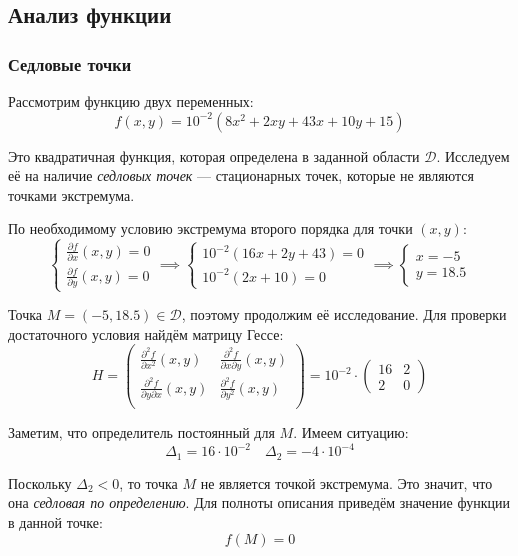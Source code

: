 \subsection{Анализ функции}

\subsubsection{Седловые точки}

Рассмотрим функцию двух переменных:
\[
  f(x,y)=10^{-2}(8x^2+2xy+43x+10y+15)
\]

Это квадратичная функция, которая определена в заданной области \( \mathcal{D} \). Исследуем её на наличие \textit{седловых точек} --- стационарных точек, которые не являются точками экстремума.

По необходимому условию экстремума второго порядка для точки \( (x,y) \):
\[
  \begin{cases}
    \frac{\partial f}{\partial x}(x,y)=0\\
    \frac{\partial f}{\partial y}(x,y)=0
  \end{cases}
  \implies
  \begin{cases}
    10^{-2}(16x + 2y + 43) = 0 \\
    10^{-2}(2x + 10) = 0
  \end{cases}
  \implies
  \begin{cases}
    x = -5 \\
    y = 18.5
  \end{cases}
\]

Точка \( M=(-5,18.5)\in\mathcal{D} \), поэтому продолжим её исследование. Для проверки достаточного условия найдём матрицу Гессе:
\[
  H=\begin{pmatrix}
    \frac{\partial^2 f}{\partial x^2}(x,y) & \frac{\partial^2 f}{\partial x\partial y}(x,y)\\
    \frac{\partial^2 f}{\partial y\partial x}(x,y) & \frac{\partial^2 f}{\partial y^2}(x,y)\\
  \end{pmatrix}=10^{-2}\cdot\begin{pmatrix}
    16 & 2\\
    2 & 0
  \end{pmatrix}
\]

Заметим, что определитель постоянный для \( M \). Имеем ситуацию:
\[
  \Delta_1=16\cdot 10^{-2}\quad\Delta_2=-4\cdot 10^{-4}
\]

Поскольку \( \Delta_2<0 \), то точка \( M \) не является точкой экстремума. Это значит, что она \textit{седловая по определению}. Для полноты описания приведём значение функции в данной точке:
\[
  f(M)=0
\]

